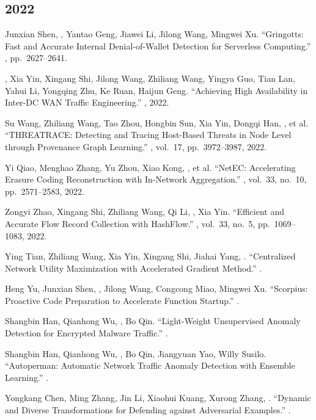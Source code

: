 \documentclass[11pt]{article}
\begin{document}
\subsection*{2022}
\begin{publist}
\item Junxian Shen, \corr, Yantao Geng, Jiawei Li, Jilong Wang, Mingwei
Xu. ``Gringotts: Fast and Accurate Internal Denial-of-Wallet Detection for Serverless
Computing.'' , pp.~2627--2641.
\item {}, Xia Yin, Xingang Shi\corr, Jilong Wang, Zhiliang Wang, Yingya
Guo, Tian Lan, Yahui Li, Yongqing Zhu, Ke Ruan, Haijun Geng. ``Achieving High
Availability in Inter-DC WAN Traffic Engineering.'' , 2022.
\item Su Wang, Zhiliang Wang\corr, Tao Zhou, Hongbin Sun, Xia Yin, Dongqi Han,
, et al. ``THREATRACE: Detecting and Tracing Host-Based Threats in Node
Level through Provenance Graph Learning.'' , vol.~17, pp.~3972--3987, 2022.
\item Yi Qiao, Menghao Zhang, Yu Zhou, Xiao Kong, \corr, et al. ``NetEC:
Accelerating Erasure Coding Reconstruction with In-Network Aggregation.''
, vol.~33, no.~10,
pp.~2571--2583, 2022.
\item Zongyi Zhao, Xingang Shi\corr, Zhiliang Wang, Qi Li, , Xia Yin.
``Efficient and Accurate Flow Record Collection with HashFlow.'' , vol.~33, no.~5, pp.~1069--1083,
2022.
\item Ying Tian, Zhiliang Wang\corr, Xia Yin, Xingang Shi, Jiahai Yang, . ``Centralized Network Utility Maximization with Accelerated Gradient Method.''
.
\item Heng Yu, Junxian Shen, \corr, Jilong Wang, Congcong Miao, Mingwei
Xu. ``Scorpius: Proactive Code Preparation to Accelerate Function Startup.''
.
\item Shangbin Han, Qianhong Wu, \corr, Bo Qin. ``Light-Weight
Unsupervised Anomaly Detection for Encrypted Malware Traffic.'' .
\item Shangbin Han, Qianhong Wu, , Bo Qin, Jiangyuan Yao, Willy Susilo.
``Autoperman: Automatic Network Traffic Anomaly Detection with Ensemble Learning.''
.
\item Yongkang Chen, Ming Zhang\corr, Jin Li, Xiaohui Kuang, Xurong Zhang, . ``Dynamic and Diverse Transformations for Defending against Adversarial
Examples.'' .
\end{publist}
\end{document}
